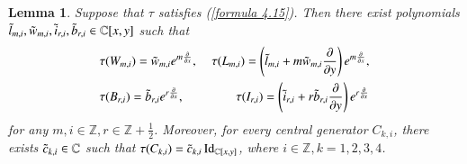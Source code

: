 \documentclass[12pt,reqno]{amsart}
\def\Z{\mathbb{Z}}
\def\C{\mathbb{C}}
\numberwithin{equation}{section}
\newtheorem{lemm}[theo]{Lemma}
\begin{document}
\begin{lemm}\label{lemm4.2}
    Suppose that $\tau$ satisfies (\ref{formula 4.15}). Then there exist polynomials $\Tilde{l}_{m,i},\Tilde{w}_{m,i},\Tilde{i}_{r,i},\Tilde{b}_{r,i}\in\C[x,y]$ such that
\begin{eqnarray}
&\tau(W_{m,i})=\Tilde{w}_{m,i}e^{m\frac{\partial}{\partial{x}}},\ &\tau(L_{m,i})=\left(\Tilde{l}_{m,i}+m\Tilde{w}_{m,i}\frac{\partial}{\partial{y}}\right)e^{m\frac{\partial}{\partial{x}}},\label{formula 4.16}\\ &\tau(B_{r,i})=\Tilde{b}_{r,i}e^{r\frac{\partial}{\partial{x}}},\ &\tau(I_{r,i})=\left(\Tilde{i}_{r,i}+r\Tilde b_{r,i}\frac{\partial}{\partial{y}}\right)e^{r\frac{\partial}{\partial{x}}}\label{formula 4.16.2}
\end{eqnarray}
for any $m,i\in\Z,r\in\Z+\frac{1}{2}$. Moreover, for every central generator $C_{k,i}$, there exists $\Tilde{c}_{k,i}\in\C$ such that $\tau(C_{k,i})=\Tilde{c}_{k,i}\operatorname{Id}_{\C[x,y]}$, where $i\in\Z,k=1,2,3,4$.
    
\end{lemm}
\end{document}
